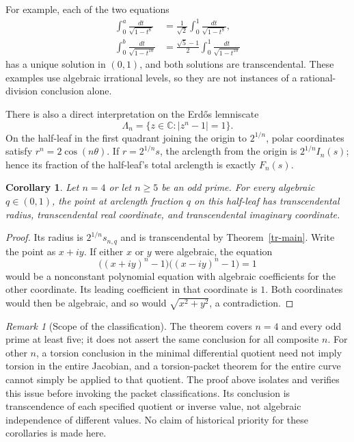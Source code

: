 \documentclass[11pt,a4paper]{article}
\newtheorem{corollary}[theorem]{Corollary}
\theoremstyle{definition}
\theoremstyle{remark}
\newtheorem{remark}[theorem]{Remark}
\numberwithin{equation}{section}
\begin{document}
For example, each of the two equations
\begin{align}
 \int_0^a\frac{dt}{\sqrt{1-t^8}}
 &=\frac1{\sqrt2}\int_0^1\frac{dt}{\sqrt{1-t^8}},
 \label{tr-example-eight}\\
 \int_0^b\frac{dt}{\sqrt{1-t^{10}}}
 &=\frac{\sqrt5-1}{2}\int_0^1\frac{dt}{\sqrt{1-t^{10}}}
 \label{tr-example-ten}
\end{align}
has a unique solution in $(0,1)$, and both solutions are
transcendental.  These examples use algebraic irrational levels, so
they are not instances of a rational-division conclusion alone.

There is also a direct interpretation on the Erd\H{o}s lemniscate
\begin{equation}\label{tr-lemniscate}
 \Lambda_n=\{z\in\mathbb C:|z^n-1|=1\}.
\end{equation}
On the half-leaf in the first quadrant joining the origin to
$2^{1/n}$, polar coordinates satisfy
$r^n=2\cos(n\theta)$.  If $r=2^{1/n}s$, the arclength from the origin
is $2^{1/n}I_n(s)$; hence its fraction of the half-leaf's total
arclength is exactly $F_n(s)$.

\begin{corollary}\label{tr-geometric-cor}
Let $n=4$ or let $n\geq5$ be an odd prime.  For every algebraic
$q\in(0,1)$, the point at arclength fraction $q$ on this half-leaf has
transcendental radius, transcendental real coordinate, and
transcendental imaginary coordinate.
\end{corollary}

\begin{proof}
Its radius is $2^{1/n}s_{n,q}$ and is transcendental by
Theorem~\ref{tr-main}.  Write the point as $x+iy$.  If either $x$ or
$y$ were algebraic, the equation
\[
 \bigl((x+iy)^n-1\bigr)\bigl((x-iy)^n-1\bigr)=1
\]
would be a nonconstant polynomial equation with algebraic
coefficients for the other coordinate.  Its leading coefficient in
that coordinate is $1$.  Both coordinates would then be algebraic,
and so would $\sqrt{x^2+y^2}$, a contradiction.
\end{proof}

\begin{remark}[Scope of the classification]\label{tr-scope}
The theorem covers $n=4$ and every odd prime at least five; it does
not assert the same conclusion for all composite $n$.  For other
$n$, a torsion conclusion in the minimal differential quotient need
not imply torsion in the entire Jacobian, and a torsion-packet theorem
for the entire curve cannot simply be applied to that quotient.
The proof above isolates and verifies this issue before invoking the
packet classifications.  Its conclusion is transcendence of each
specified quotient or inverse value, not algebraic independence of
different values.  No claim of historical priority for these
corollaries is made here.
\end{remark}
\end{document}
